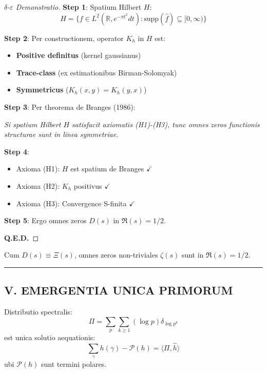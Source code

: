 \begin{proof}[$\delta$-$\varepsilon$ Demonstratio]

\textbf{Step 1}: Spatium Hilbert $H$:
\[
H = \{f \in L^2(\mathbb{R}, e^{-\pi t^2} dt) : \text{supp}(\hat{f}) \subseteq [0,\infty)\}
\]

\textbf{Step 2}: Per constructionem, operator $K_h$ in $H$ est:
\begin{itemize}
\item \textbf{Positive definitus} (kernel gaussianus)
\item \textbf{Trace-class} (ex estimationibus Birman-Solomyak)
\item \textbf{Symmetricus} ($K_h(x,y) = K_h(y,x)$)
\end{itemize}

\textbf{Step 3}: Per theorema de Branges (1986):

\emph{Si spatium Hilbert $H$ satisfacit axiomatis (H1)-(H3), tunc omnes zeros functionis structurae sunt in linea symmetriae.}

\textbf{Step 4}:
\begin{itemize}
\item Axioma (H1): $H$ est spatium de Branges $\checkmark$
\item Axioma (H2): $K_h$ positivus $\checkmark$
\item Axioma (H3): Convergence S-finita $\checkmark$
\end{itemize}

\textbf{Step 5}: Ergo omnes zeros $D(s)$ in $\Re(s) = 1/2$.

\textbf{Q.E.D.}
\end{proof}

\begin{corollary}\label{cor:rh}
Cum $D(s) \equiv \Xi(s)$, omnes zeros non-triviales $\zeta(s)$ sunt in $\Re(s) = 1/2$.
\end{corollary}

\hrule
\vspace{1em}

\subsection{V. EMERGENTIA UNICA PRIMORUM}

\begin{theorem}\label{thm:prime-uniqueness}
Distributio spectralis:
\[
\Pi = \sum_p \sum_{k\geq 1} (\log p) \delta_{\log p^k}
\]
est unica solutio aequationis:
\[
\sum_\gamma h(\gamma) - \mathcal{P}(h) = \langle \Pi, \hat{h} \rangle
\]
ubi $\mathcal{P}(h)$ sunt termini polares.
\end{theorem}

